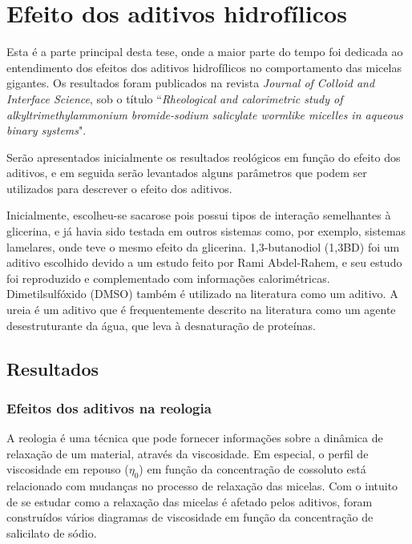 \part{Efeito dos aditivos hidrofílicos}
	\label{sec:efeito_aditivos_hidrofilicos}
	Esta é a parte principal desta tese, onde a maior parte do tempo foi dedicada ao entendimento dos efeitos dos aditivos hidrofílicos no comportamento das micelas gigantes. Os resultados foram publicados na revista \emph{Journal of Colloid and Interface Science}, sob o título ``\emph{Rheological and calorimetric study of alkyltrimethylammonium bromide-sodium salicylate wormlike micelles in aqueous binary systems}".
	
	Serão apresentados inicialmente os resultados reológicos em função do efeito dos aditivos, e em seguida serão levantados alguns parâmetros que podem ser utilizados para descrever o efeito dos aditivos.
	
	Inicialmente, escolheu-se sacarose pois possui tipos de interação semelhantes à glicerina, e já havia sido testada em outros sistemas como, por exemplo, sistemas lamelares, onde teve o mesmo efeito da glicerina. 1,3-butanodiol (1,3BD) foi um aditivo escolhido devido a um estudo feito por Rami Abdel-Rahem, e seu estudo foi reproduzido e complementado com informações calorimétricas. Dimetilsulfóxido (DMSO) também é utilizado na literatura como um aditivo. A ureia é um aditivo que é frequentemente descrito na literatura como um agente desestruturante da água, que leva à desnaturação de proteínas.
	
	
	\chapter{Resultados}
		\section{Efeitos dos aditivos na reologia}
			
			A reologia é uma técnica que pode fornecer informações sobre a dinâmica de relaxação de um material, através da viscosidade. Em especial, o perfil de viscosidade em repouso (\(\eta_0\)) em função da concentração de cossoluto está relacionado com mudanças no processo de relaxação das micelas. Com o intuito de se estudar como a relaxação das micelas é afetado pelos aditivos, foram construídos vários diagramas de viscosidade em função da concentração de salicilato de sódio.
			
